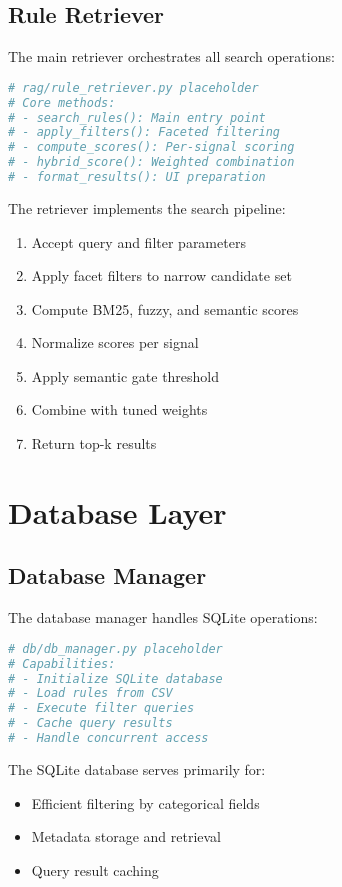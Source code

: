 \subsection{Rule Retriever}

The main retriever orchestrates all search operations:

\begin{lstlisting}[language=Python, caption={Rule retriever orchestration}, label={lst:rule-retriever}]
# rag/rule_retriever.py placeholder
# Core methods:
# - search_rules(): Main entry point
# - apply_filters(): Faceted filtering
# - compute_scores(): Per-signal scoring
# - hybrid_score(): Weighted combination
# - format_results(): UI preparation
\end{lstlisting}

The retriever implements the search pipeline:
\begin{enumerate}[leftmargin=*,itemsep=2pt,topsep=2pt]
 \item Accept query and filter parameters
 \item Apply facet filters to narrow candidate set
 \item Compute BM25, fuzzy, and semantic scores
 \item Normalize scores per signal
 \item Apply semantic gate threshold
 \item Combine with tuned weights
 \item Return top-k results
\end{enumerate}

\section{Database Layer}

\subsection{Database Manager}

The database manager handles SQLite operations:

\begin{lstlisting}[language=Python, caption={Database manager implementation}, label={lst:db-manager}]
# db/db_manager.py placeholder
# Capabilities:
# - Initialize SQLite database
# - Load rules from CSV
# - Execute filter queries
# - Cache query results
# - Handle concurrent access
\end{lstlisting}

The SQLite database serves primarily for:
\begin{itemize}[leftmargin=*,itemsep=2pt,topsep=2pt]
 \item Efficient filtering by categorical fields
 \item Metadata storage and retrieval
 \item Query result caching
\end{itemize}

